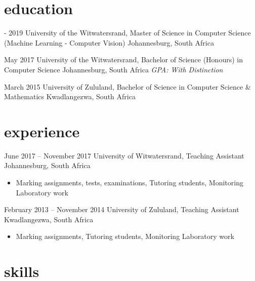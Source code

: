 \documentclass[]{friggeri-cv}
\begin{document}
\section{education}
\begin{entrylist}
	
	\entry
	{- 2019}
	{University of the Witwatersrand, {\normalfont Master of Science in Computer Science (Machine Learning - Computer Vision)}}
	{Johannesburg, South Africa}
	{}
	  
	
	\entry
	{May 2017}
	{University of the Witwatersrand, {\normalfont Bachelor of Science (Honours) in Computer Science}}
	{Johannesburg, South Africa}
	{\emph{GPA: With Distinction}}
	  
	
	\entry
	{March 2015}
	{University of Zululand, {\normalfont Bachelor of Science in Computer Science \& Mathematics}}
	{Kwadlangezwa, South Africa}
	{}
	  
\end{entrylist}
\section{experience}
\begin{entrylist}
	      
	\entry
	{June 2017 – November 2017}
	{University of Witwatersrand, Teaching Assistant}
	{Johannesburg, South Africa}
	{\vspace{-3mm}\begin{itemize}[leftmargin=10pt,itemsep=4pt]
		\item Marking assignments, tests, examinations, Tutoring students, Monitoring Laboratory work
		\end{itemize}}
	        
	      
	\entry
	{February 2013 – November 2014}
	{University of Zululand, Teaching Assistant}
	{Kwadlangezwa, South Africa}
	{\vspace{-3mm}\begin{itemize}[leftmargin=10pt,itemsep=4pt]
		\item Marking assignments, Tutoring students, Monitoring Laboratory work
		\end{itemize}}
	        
\end{entrylist}
\section{skills}
\begin{entrylist}
\end{entrylist}
\end{document}
